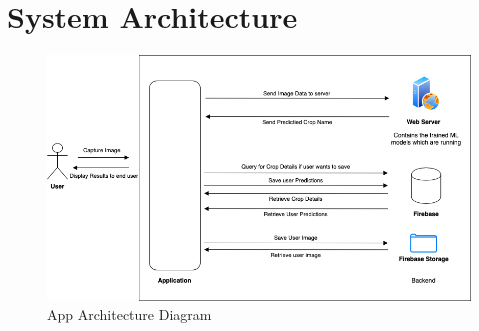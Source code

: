 \documentclass[../Report.tex]{subfiles}
\begin{document}
\section{System Architecture}
\begin{figure}[H]
    \includegraphics[width=\linewidth]{images/architecture.png}
    \caption{App Architecture Diagram}
    \label{fig:architecture}
\end{figure}
\end{document}
